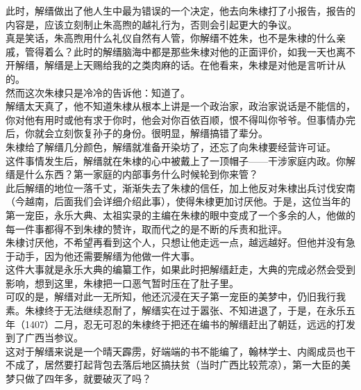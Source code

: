 \begin{multicols}{\theparacolNo}
此时，解缙做出了他人生中最为错误的一个决定，他去向朱棣打了小报告，报告的内容是，应该立刻制止朱高煦的越礼行为，否则会引起更大的争议。\\

真是笑话，朱高煦用什么礼仪自然有人管，你解缙不姓朱，也不是朱棣的什么亲戚，管得着么？此时的解缙脑海中都是那些朱棣对他的正面评价，如我一天也离不开解缙，解缙是上天赐给我的之类肉麻的话。在他看来，朱棣是对他是言听计从的。\\

然而这次朱棣只是冷冷的告诉他：知道了。\\

解缙太天真了，他不知道朱棣从根本上讲是一个政治家，政治家说话是不能信的，你对他有用时或他有求于你时，他会对你百依百顺，恨不得叫你爷爷。但事情办完后，你就会立刻恢复孙子的身份。很明显，解缙搞错了辈分。\\

朱棣给了解缙几分颜色，解缙就准备开染坊了，还忘了向朱棣要经营许可证。\\

这件事情发生后，解缙就在朱棣的心中被戴上了一顶帽子——干涉家庭内政。你解缙是什么东西？第一家庭的内部事务什么时候轮到你来管？\\

此后解缙的地位一落千丈，渐渐失去了朱棣的信任，加上他反对朱棣出兵讨伐安南（今越南，后面我们会详细介绍此事），使得朱棣更加讨厌他。于是，这位当年的第一宠臣，永乐大典、太祖实录的主编在朱棣的眼中变成了一个多余的人，他做的每一件事都得不到朱棣的赞许，取而代之的是不断的斥责和批评。\\

朱棣讨厌他，不希望再看到这个人，只想让他走远一点，越远越好。但他并没有急于动手，因为他还需要解缙为他做一件大事。\\

这件大事就是永乐大典的编纂工作，如果此时把解缙赶走，大典的完成必然会受到影响，想到这里，朱棣把一口恶气暂时压在了肚子里。\\

可叹的是，解缙对此一无所知，他还沉浸在天子第一宠臣的美梦中，仍旧我行我素。朱棣终于无法继续忍耐了，解缙实在过于嚣张、不知进退了，于是，在永乐五年（1407）二月，忍无可忍的朱棣终于把还在编书的解缙赶出了朝廷，远远的打发到了广西当参议。\\

这对于解缙来说是一个晴天霹雳，好端端的书不能编了，翰林学士、内阁成员也干不成了，居然要打起背包去落后地区搞扶贫（当时广西比较荒凉），第一大臣的美梦只做了四年多，就要破灭了吗？\\


\end{multicols}
